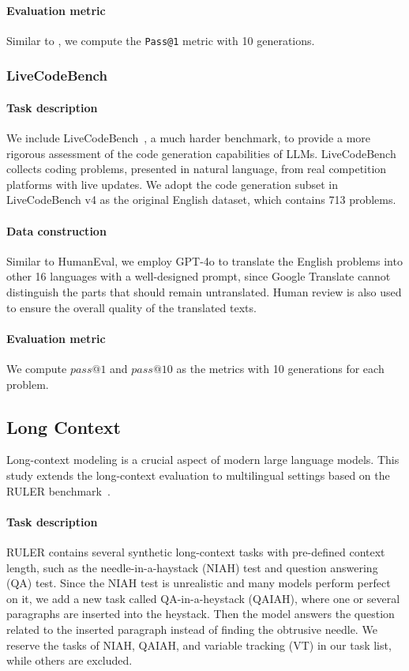 \paragraph{Evaluation metric}
Similar to \citet{chen2021evaluating}, we compute the \texttt{Pass@1} metric with 10 generations.

\subsubsection{LiveCodeBench}
\paragraph{Task description}
We include LiveCodeBench~\cite{jain2024livecodebench}, a much harder benchmark, to provide a more rigorous assessment of the code generation capabilities of LLMs.
LiveCodeBench collects coding problems, presented in natural language, from real competition platforms with live updates.
We adopt the code generation subset in LiveCodeBench v4 as the original English dataset, which contains 713 problems. 

\paragraph{Data construction}
Similar to HumanEval, we employ GPT-4o to translate the English problems into other 16 languages with a well-designed prompt, since Google Translate cannot distinguish the parts that should remain untranslated.
Human review is also used to ensure the overall quality of the translated texts.

\paragraph{Evaluation metric}
We compute $pass@1$ and $pass@10$ as the metrics with 10 generations for each problem.

\subsection{Long Context}
Long-context modeling is a crucial aspect of modern large language models.
This study extends the long-context evaluation to multilingual settings based on the RULER benchmark~\cite{hsieh2024ruler}.
\paragraph{Task description}
RULER contains several synthetic long-context tasks with pre-defined context length,  such as the needle-in-a-haystack (NIAH) test and question answering (QA) test.
Since the NIAH test is unrealistic and many models perform perfect on it, we add a new task called QA-in-a-heystack (QAIAH), where one or several paragraphs are inserted into the heystack.
Then the model answers the question related to the inserted paragraph instead of finding the obtrusive needle.
We reserve the tasks of NIAH, QAIAH, and variable tracking (VT) in our task list, while others are excluded.

